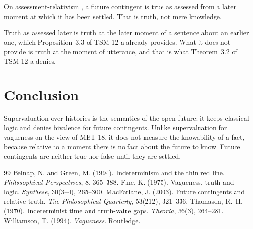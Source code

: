 \documentclass{situationist-preprint}
\begin{document}
\begin{objection}
On assessment-relativism \citep{MacFarlane2003}, a future contingent is true as assessed from a later moment at which it has been settled. That is truth, not mere knowledge.
\end{objection}

\begin{reply}
Truth as assessed later is truth at the later moment of a sentence about an earlier one, which Proposition~3.3 of TSM-12-a already provides. What it does not provide is truth at the moment of utterance, and that is what Theorem~3.2 of TSM-12-a denies.
\end{reply}

\section{Conclusion}

Supervaluation over histories is the semantics of the open future: it keeps classical logic and denies bivalence for future contingents. Unlike supervaluation for vagueness on the view of MET-18, it does not measure the knowability of a fact, because relative to a moment there is no fact about the future to know. Future contingents are neither true nor false until they are settled.

\begin{thebibliography}{99}\small
{} Belnap, N. and Green, M. (1994). Indeterminism and the thin red line. \emph{Philosophical Perspectives}, 8, 365--388.
 Fine, K. (1975). Vagueness, truth and logic. \emph{Synthese}, 30(3--4), 265--300.
 MacFarlane, J. (2003). Future contingents and relative truth. \emph{The Philosophical Quarterly}, 53(212), 321--336.
 Thomason, R.~H. (1970). Indeterminist time and truth-value gaps. \emph{Theoria}, 36(3), 264--281.
 Williamson, T. (1994). \emph{Vagueness}. Routledge.
\end{thebibliography}
\end{document}

